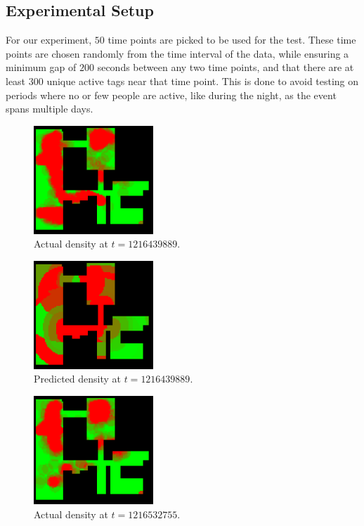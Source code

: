 \documentclass[letterpaper]{article}
\begin{document}
\subsection{Experimental Setup}

For our experiment, $50$ time points are picked to be used for the test. These time points are chosen randomly from the time interval of the data, while ensuring a minimum gap of $200$ seconds between any two time points, and that there are at least $300$ unique active tags near that time point. This is done to avoid testing on periods where no or few people are active, like during the night, as the event spans multiple days.\\

\begin{figure}[h!]
  \centering
    \includegraphics[width=170px]{diagrams/26-27_86-83_59-49_1216439889_actual.png}
  \caption{Actual density at $t=1216439889$.}
  \label{fig:t1dist}
\end{figure}

\begin{figure}[h!]
  \centering
    \includegraphics[width=170px]{diagrams/26-27_86-83_59-49_1216439889_predicted.png}
  \caption{Predicted density at $t=1216439889$.}
  \label{fig:t2dist}
\end{figure}

\begin{figure}[h!]
  \centering
    \includegraphics[width=170px]{diagrams/26-27_86-83_59-49_1216532755_actual.png}
  \caption{Actual density at $t=1216532755$.}
  \label{fig:t3dist}
\end{figure}
\end{document}
